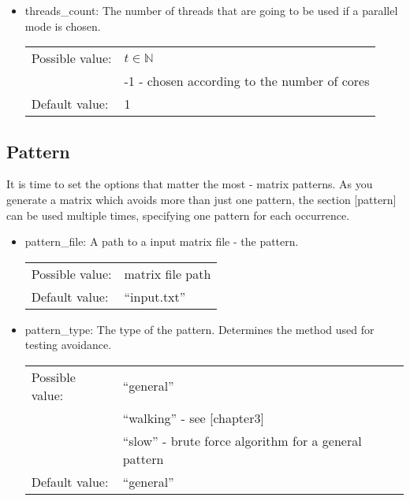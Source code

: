 \begin{itemize}
\item threads\_count: The number of threads that are going to be used if a parallel mode is chosen.

\begin{tabular}{ll}
Possible value: & $t\in\mathbb{N}$ \\
& -1 - chosen according to the number of cores \\
Default value: & 1
\end{tabular}

\end{itemize}

\subsection{Pattern}
It is time to set the options that matter the most - matrix patterns. As you generate a matrix which avoids more than just one pattern, the section [pattern] can be used multiple times, specifying one pattern for each occurrence.
\begin{itemize}
\item pattern\_file: A path to a input matrix file - the pattern.

\begin{tabular}{ll}
Possible value: & matrix file path \\
Default value: & ``input.txt''
\end{tabular}

\item pattern\_type: The type of the pattern. Determines the method used for testing avoidance.

\begin{tabular}{ll}
Possible value: & ``general'' \\
& ``walking'' - see [chapter3] \\
& ``slow'' - brute force algorithm for a general pattern \\
Default value: & ``general''
\end{tabular}
\end{itemize}

